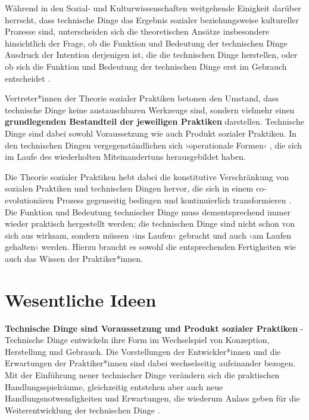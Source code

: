 \documentclass[
  a4paper,
]{book}
\begin{document}
Während in den Sozial- und Kulturwissenschaften weitgehende Einigkeit darüber herrscht, dass technische Dinge das Ergebnis sozialer beziehungsweise kultureller Prozesse sind, unterscheiden sich die theoretischen Ansätze insbesondere hinsichtlich der Frage, ob die Funktion und Bedeutung der technischen Dinge Ausdruck der Intention derjenigen ist, die die technischen Dinge herstellen, oder ob sich die Funktion und Bedeutung der technischen Dinge erst im Gebrauch entscheidet \citep{orlikowskiUsingTechnologyConstituting2000}.

Vertreter*innen der Theorie sozialer Praktiken betonen den Umstand, dass technische Dinge keine austauschbaren Werkzeuge sind, sondern vielmehr einen \textbf{grundlegenden Bestandteil der jeweiligen Praktiken} darstellen. Technische Dinge sind dabei sowohl Voraussetzung wie auch Produkt sozialer Praktiken. In den technischen Dingen vergegenständlichen sich ›operationale Formen‹ \citep{floydAutooperationaleFormUnd1997}, die sich im Laufe des wiederholten Miteinandertuns herausgebildet haben.

Die Theorie sozialer Praktiken hebt dabei die konstitutive Verschränkung von sozialen Praktiken und technischen Dingen hervor, die sich in einem co-evolutionären Prozess gegenseitig bedingen und kontinuierlich transformieren \citep{mitchamThinkingTechnologyPath1994, shoveDynamicsSocialPractice2012}. Die Funktion und Bedeutung technischer Dinge muss dementsprechend immer wieder praktisch hergestellt werden; die technischen Dinge sind nicht schon von sich aus wirksam, sondern müssen ›ins Laufen‹ gebracht und auch ›am Laufen gehalten‹ werden. Hierzu braucht es sowohl die entsprechenden Fertigkeiten wie auch das Wissen der Praktiker*innen.

\section{Wesentliche Ideen}\label{wesentliche-ideen-1}

\textbf{Technische Dinge sind Voraussetzung und Produkt sozialer Praktiken} - Technische Dinge entwickeln ihre Form im Wechselspiel von Konzeption, Herstellung und Gebrauch. Die Vorstellungen der Entwickler*innen und die Erwartungen der Praktiker*innen sind dabei wechselseitig aufeinander bezogen. Mit der Einführung neuer technischer Dinge verändern sich die praktischen Handlungsspielräume, gleichzeitig entstehen aber auch neue Handlungsnotwendigkeiten und Erwartungen, die wiederum Anlass geben für die Weiterentwicklung der technischen Dinge \citep{shoveDynamicsSocialPractice2012}.
\end{document}

